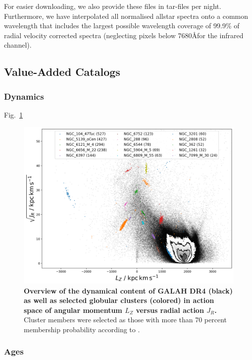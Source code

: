 \documentclass[
  journal=pasa,
  manuscript=research-paper, %
  year=2023,
  volume=37
]{cup-journal}
\begin{document}
For easier downloading, we also provide these files in tar-files per night. Furthermore, we have interpolated all normalised allstar spectra onto a common wavelength that includes the largest possible wavelength coverage of 99.9\% of radial velocity corrected spectra (neglecting pixels below 7680\AA for the infrared channel).

\subsection{Value-Added Catalogs}

\subsubsection{Dynamics}

Fig.~\ref{fig:galah_dr4_lz_jr_with_gcs}

\begin{landscape}
\begin{figure}
\includegraphics[width=0.975\columnwidth]{figures/galah_dr4_lz_jr_with_gcs.png}
\caption{
\textbf{Overview of the dynamical content of GALAH DR4 (black) as well as selected globular clusters (colored) in action space of angular momentum $L_Z$ versus radial action $J_R$.} Cluster members were selected as those with more than 70 percent membership probability according to \citet{Vasiliev2021}.
}
\label{fig:galah_dr4_lz_jr_with_gcs}
\end{figure}
\end{landscape}

\subsubsection{Ages}
\end{document}
